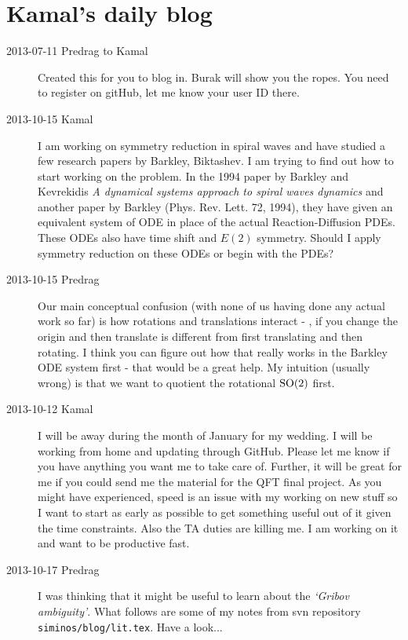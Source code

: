 
\chapter{Kamal's daily blog}
\label{c-dailyBlogKS}

\begin{description}
\item[2013-07-11  Predrag to Kamal] Created this for you to blog
in. Burak will show you the ropes. You need to register on gitHub, let me
know your user ID there.

\item[2013-10-15  Kamal] I am working on symmetry reduction in spiral waves and have studied a few research papers by Barkley, Biktashev. I am trying to find out how to start working on the problem. In the 1994 paper by Barkley and Kevrekidis {\em A dynamical systems approach to spiral waves dynamics} and another paper by Barkley (Phys. Rev. Lett. 72, 1994), they have given an equivalent system of ODE in place of the actual Reaction-Diffusion PDEs. These ODEs also have time shift and $E(2)$ symmetry. Should I apply symmetry reduction on these ODEs or begin with the PDEs?

\item[2013-10-15 Predrag] Our main conceptual confusion (with none of us having
done any actual work so far) is how rotations and translations interact - \ie, if you change the origin and then translate is different from first translating and then rotating. I think you can figure out how that really works in the Barkley ODE system first - that would be a great help. My intuition (usually wrong) is that we want to
quotient the rotational $\textrm{SO}(2)$ first.

\item[2013-10-12  Kamal] I will be away during the month of January for my wedding. 
I will be working from home and updating through GitHub.
Please let me know if you have anything you want me to take care of.
Further, it will be great for me if you could send me the material 
for the QFT final project. As you might have experienced, speed is 
an issue with my working on new stuff so I want to start as early 
as possible to get something useful out of it given the time constraints. 
Also the TA duties are killing me. I am working on it and want to be productive fast.

\item[2013-10-17 Predrag] I was thinking that it might be useful to
learn about the \emph{`Gribov ambiguity'}. 
What follows are some of my notes from
svn repository 
\\
\texttt{siminos/blog/lit.tex}. Have a look...


\end{description}
